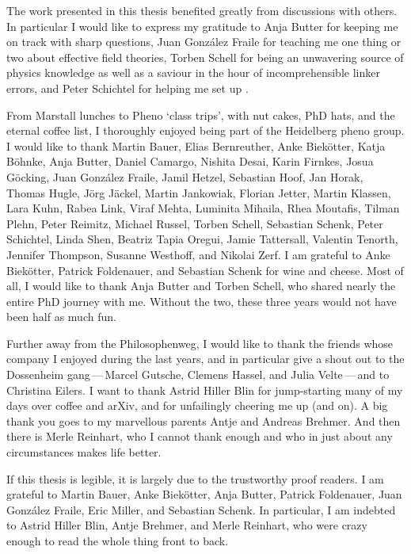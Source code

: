 The work presented in this thesis benefited greatly from discussions
with others. In particular I would like to express my gratitude to
Anja Butter for keeping me on track with sharp questions, Juan
Gonz\'alez Fraile for teaching me one thing or two about effective
field theories, Torben Schell for being an unwavering source of physics
knowledge as well as a saviour in the hour of incomprehensible linker
errors, and Peter Schichtel for helping me set up
.

From Marstall lunches to Pheno `class trips', with nut cakes, PhD
hats, and the eternal coffee list,
%
I thoroughly enjoyed being part of the Heidelberg pheno group.
%
%
I would like to thank Martin Bauer, Elias Bernreuther, Anke
Biek\"otter, Katja B\"ohnke, Anja Butter, Daniel Camargo, Nishita
Desai, Karin Firnkes, Josua G\"ocking, Juan Gonz\'alez Fraile, Jamil
Hetzel, Sebastian Hoof, Jan Horak, Thomas Hugle, J\"org J\"ackel,
Martin Jankowiak, Florian Jetter, Martin Klassen, Lara Kuhn, Rabea
Link, Viraf Mehta, Luminita Mihaila, Rhea Moutafis, Tilman Plehn,
Peter Reimitz, Michael Russel, Torben Schell, Sebastian Schenk, Peter
Schichtel, Linda Shen, Beatriz Tapia Oregui, Jamie Tattersall,
Valentin Tenorth, Jennifer Thompson, Susanne Westhoff, and Nikolai
Zerf. I am grateful to Anke Biek\"otter, Patrick Foldenauer, and
Sebastian Schenk for wine and cheese. Most of all, I would like to
thank Anja Butter and Torben Schell, who shared nearly the entire PhD
journey with me. Without the two, these three years would not have
been half as much fun.

Further away from the Philosophenweg, I would like to thank the
friends whose company I enjoyed during the last years, and in
particular give a shout out to the Dossenheim gang\,---\,Marcel
Gutsche, Clemens Hassel, and Julia Velte\,---\,and to Christina
Eilers. I want to thank Astrid Hiller Blin for jump-starting many of
my days over coffee and arXiv, and for unfailingly cheering me up (and
on). A big thank you goes to my marvellous parents Antje and Andreas
Brehmer. And then there is Merle Reinhart, who I cannot thank enough
and who in just about any circumstances makes life better.

If this thesis is legible, it is largely due to the trustworthy proof
readers. I am grateful to Martin Bauer, Anke Biek\"otter, Anja Butter,
Patrick Foldenauer, Juan Gonz\'alez Fraile, Eric Miller, and Sebastian
Schenk. In particular, I am indebted to Astrid Hiller Blin, Antje
Brehmer, and Merle Reinhart, who were crazy enough to read the whole
thing front to back.

